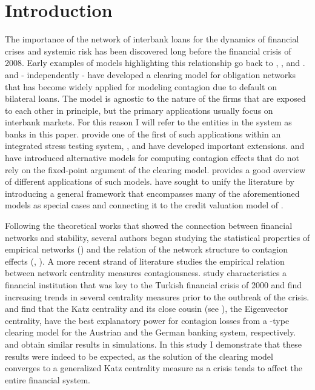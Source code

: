 \documentclass[authoryear,12pt]{elsarticle}
\begin{document}
\section{Introduction} \label{sec_Introduction}

The importance of the network of interbank loans for the dynamics of financial crises and systemic risk has been discovered long before the financial crisis of 2008. Early examples of models highlighting this relationship go back to \cite{Rochet1996}, \cite{Freixas2000}, \cite{Allen2000} and \cite{Kiyotaki2002}. \cite{Eisenberg2001} and - independently - \cite{Suzuki2002} have developed a clearing model for obligation networks that has become widely applied for modeling contagion due to default on bilateral loans. The model is agnostic to the nature of the firms that are exposed to each other in principle, but the primary applications usually focus on interbank markets. For this reason I will refer to the entities in the system as banks in this paper. \cite{Elsinger2006} provide one of the first of such applications within an integrated stress testing system, \cite{Elsinger2009}, \cite{Rogers2013} and \cite{Fischer2014} have developed important extensions. \cite{Battiston2012} and \cite{Furfine2003} have introduced alternative models for computing contagion effects that do not rely on the fixed-point argument of the clearing model. \cite{Upper2011} provides a good overview of different applications of such models. \cite{Barucca2016} have sought to unify the literature by introducing a general framework that encompasses many of the aforementioned models as special cases and connecting it to the credit valuation model of \cite{Merton1974}.

Following the theoretical works that showed the connection between financial networks and stability, several authors began studying the statistical properties of empirical networks (\cite{Boss2004}) and the relation of the network structure to contagion effects (\cite{Iori2006}, \cite{Nier2007}). A more recent strand of literature studies the empirical relation between network centrality measures contagiousness. \cite{Kuzubas2014} study characteristics a financial institution that was key to the Turkish financial crisis of 2000 and find increasing trends in several centrality measures prior to the outbreak of the crisis. \cite{Puhr2014} and \cite{Alter2015} find that the Katz centrality and its close cousin (see \cite{Newman2010}), the Eigenvector centrality, have the best explanatory power for contagion losses from a \cite{Eisenberg2001}-type clearing model for the Austrian and the German banking system, respectively. \cite{Kobayashi2013} and \cite{Gauthier2013} obtain similar results in simulations. In this study I demonstrate that these results were indeed to be expected, as the solution of the clearing model converges to a generalized Katz centrality measure as a crisis tends to affect the entire financial system.
\end{document}
